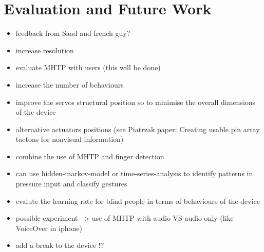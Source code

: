 \chapter{Evaluation and Future Work}


\begin{itemize}
	\item feedback from Saad and french guy?
	\item increase resolution
    \item evaluate MHTP with users (this will be done)
    \item increase the number of behaviours
    \item improve the servos structural position so to minimise the overall dimensions of the device
    \item alternative actuators positions (see Piatrzak paper: Creating usable pin array tactons for nonvisual information)
    \item combine the use of MHTP and finger detection
    \item can use hidden-markov-model or time-series-analysis to identify patterns in pressure input and classify gestures
    \item evalute the learning rate for blind people in terms of behaviours of the device
    \item possible experiment --> use of MHTP with audio VS audio only (like VoiceOver in iphone)
    \item add a break to the device !?
\end{itemize}